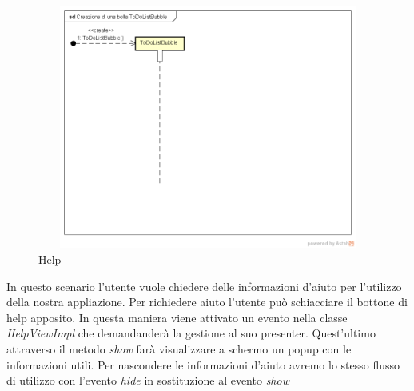 \label{Help}
\begin{figure}[ht]
	\centering
	\includegraphics[width=12cm, height=8cm]{Sezioni/Diagrammi/img/Creazione di una bolla ToDoListBubble.png}
	\caption{Help}
	
\end{figure}

In questo scenario l'utente vuole chiedere delle informazioni d'aiuto per l'utilizzo della nostra appliazione. Per richiedere aiuto l'utente può schiacciare il bottone di help apposito. In questa maniera viene attivato un evento nella classe \textit{HelpViewImpl} che demandanderà la gestione al suo presenter. Quest'ultimo attraverso il metodo \textit{show} farà visualizzare a schermo un popup con le informazioni utili. Per nascondere le informazioni d'aiuto avremo lo stesso flusso di utilizzo con l'evento \textit{hide} in sostituzione al evento \textit{show}
